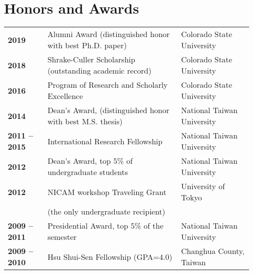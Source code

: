 \documentclass{article}
\begin{document}
\section{\color{airforceblue}Honors and Awards}
\begin{tabular}{>{\bfseries}p{2.5cm}p{10cm}p{\linewidth-2.5cm\relax}}
     2019   & Alumni Award (distinguished honor with best Ph.D. paper) & Colorado State University 
     \\
     2018   & Shrake-Culler Scholarship (outstanding academic record) & Colorado State University 
     \\  
	 2016   & Program of Research and Scholarly Excellence & Colorado State University 
	 \\
     2014  & Dean’s Award, (distinguished honor with best M.S. thesis) & National Taiwan University 
     \\
     2011 -- 2015 & International Research Fellowship & National Taiwan University 
     \\
     2012        & Dean’s Award, top 5\% of undergraduate students & National Taiwan University  
     \\
     2012        & NICAM workshop Traveling Grant  & University of Tokyo
     \\
                  & (the only undergraduate recipient)                                            &  \\  
     2009 -- 2011 & Presidential Award, top 5\% of the semester & National Taiwan University 
     \\

     2009 -- 2010 & Hsu Shui-Sen Fellowship (GPA=4.0)  & Changhua County, Taiwan 
     
\end{tabular}
\end{document}
